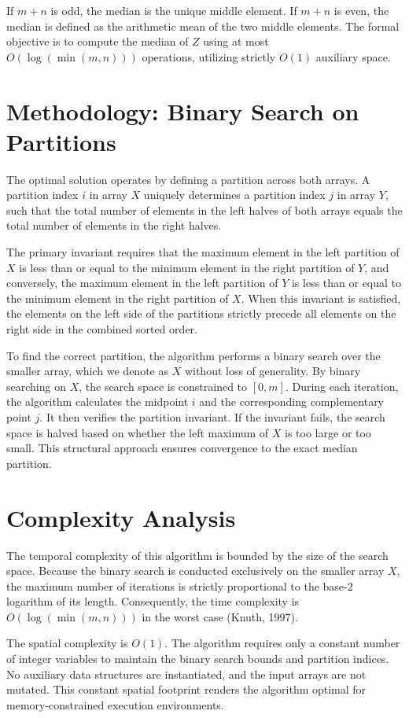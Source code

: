 \documentclass[10pt,journal,compsoc]{IEEEtran}
\begin{document}
If $m + n$ is odd, the median is the unique middle element. If $m + n$ is even, the median is defined as the arithmetic mean of the two middle elements. The formal objective is to compute the median of $Z$ using at most $O(\log(\min(m, n)))$ operations, utilizing strictly $O(1)$ auxiliary space.

\section{Methodology: Binary Search on Partitions}
The optimal solution operates by defining a partition across both arrays. A partition index $i$ in array $X$ uniquely determines a partition index $j$ in array $Y$, such that the total number of elements in the left halves of both arrays equals the total number of elements in the right halves. 

The primary invariant requires that the maximum element in the left partition of $X$ is less than or equal to the minimum element in the right partition of $Y$, and conversely, the maximum element in the left partition of $Y$ is less than or equal to the minimum element in the right partition of $X$. When this invariant is satisfied, the elements on the left side of the partitions strictly precede all elements on the right side in the combined sorted order.

To find the correct partition, the algorithm performs a binary search over the smaller array, which we denote as $X$ without loss of generality. By binary searching on $X$, the search space is constrained to $[0, m]$. During each iteration, the algorithm calculates the midpoint $i$ and the corresponding complementary point $j$. It then verifies the partition invariant. If the invariant fails, the search space is halved based on whether the left maximum of $X$ is too large or too small. This structural approach ensures convergence to the exact median partition.

\section{Complexity Analysis}
The temporal complexity of this algorithm is bounded by the size of the search space. Because the binary search is conducted exclusively on the smaller array $X$, the maximum number of iterations is strictly proportional to the base-2 logarithm of its length. Consequently, the time complexity is $O(\log(\min(m, n)))$ in the worst case (Knuth, 1997). 

The spatial complexity is $O(1)$. The algorithm requires only a constant number of integer variables to maintain the binary search bounds and partition indices. No auxiliary data structures are instantiated, and the input arrays are not mutated. This constant spatial footprint renders the algorithm optimal for memory-constrained execution environments.
\end{document}
